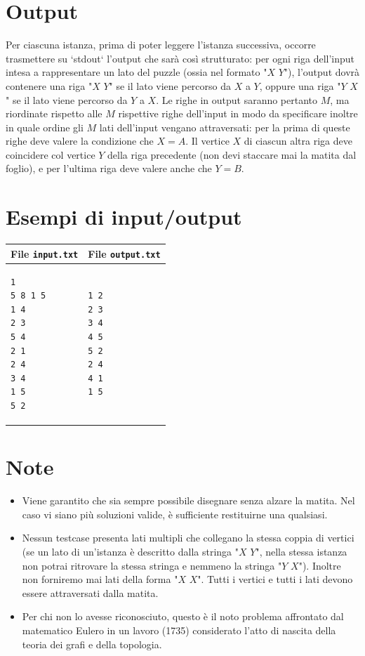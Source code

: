 \documentclass[a4paper,11pt]{article}
\begin{document}
\section*{Output}  
Per ciascuna istanza, prima di poter leggere l'istanza successiva, occorre trasmettere su `stdout` l'output che sarà così strutturato:
per ogni riga dell'input intesa a rappresentare un lato del puzzle (ossia nel formato "$X$ $Y$"), l'output dovrà contenere una riga "$X$ $Y$" se il lato viene percorso da $X$ a $Y$, oppure una riga "$Y$ $X$" se il lato viene percorso da $Y$ a $X$.
Le righe in output saranno pertanto $M$, ma riordinate rispetto alle $M$ rispettive righe dell'input in modo da specificare inoltre in quale ordine gli $M$ lati dell'input vengano attraversati: per la prima di queste righe deve valere la condizione che $X = A$. Il vertice $X$ di ciascun altra riga deve coincidere col vertice $Y$ della riga precedente (non devi staccare mai la matita dal foglio), e per l'ultima riga deve valere anche che $Y=B$.


\section*{Esempi di input/output}

  
    \noindent
    \begin{tabular}{p{11cm}|p{5cm}}
    \toprule
    \textbf{File \texttt{input.txt}}
    & \textbf{File \texttt{output.txt}}
    \\
    \midrule
    \scriptsize
    \begin{verbatim}
1
5 8 1 5
1 4
2 3
5 4
2 1
2 4
3 4
1 5
5 2
\end{verbatim}
    &
    \scriptsize
    \begin{verbatim}
1 2
2 3
3 4
4 5
5 2
2 4
4 1
1 5
\end{verbatim}
    \\
    \bottomrule
    \end{tabular}
  
\section*{Note}
\begin{itemize}
  
    \item 
Viene garantito che sia sempre possibile disegnare senza alzare la matita. Nel caso vi siano più soluzioni valide, è sufficiente restituirne una qualsiasi.

    \item 
Nessun testcase presenta lati multipli che collegano la stessa coppia di vertici (se un lato di un'istanza è descritto dalla stringa "$X$ $Y$", nella stessa istanza non potrai ritrovare la stessa stringa e nemmeno la stringa "$Y$ $X$"). Inoltre non forniremo mai lati della forma "$X$ $X$". Tutti i vertici e tutti i lati devono essere attraversati dalla matita.

    \item 
    Per chi non lo avesse riconosciuto, questo è il noto problema affrontato dal matematico Eulero in un lavoro (1735) considerato l'atto di nascita della teoria dei grafi e della topologia.

\end{itemize}
\end{document}
